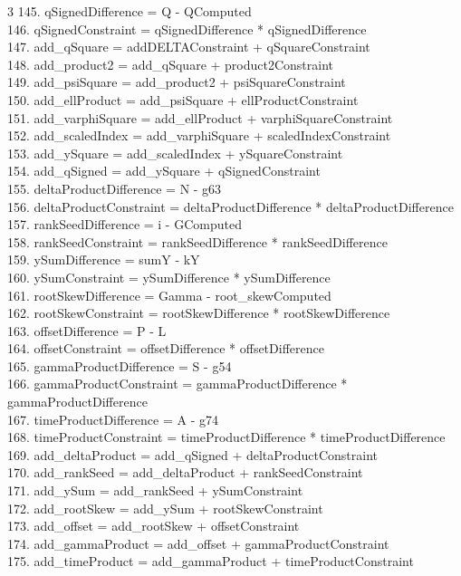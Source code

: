 \documentclass[10pt]{article}
\begin{document}
\begin{multicols}{3}
145. qSignedDifference = Q - QComputed\\
146. qSignedConstraint = qSignedDifference * qSignedDifference\\
147. add\_qSquare = addDELTAConstraint + qSquareConstraint\\
148. add\_product2 = add\_qSquare + product2Constraint\\
149. add\_psiSquare = add\_product2 + psiSquareConstraint\\
150. add\_ellProduct = add\_psiSquare + ellProductConstraint\\
151. add\_varphiSquare = add\_ellProduct + varphiSquareConstraint\\
152. add\_scaledIndex = add\_varphiSquare + scaledIndexConstraint\\
153. add\_ySquare = add\_scaledIndex + ySquareConstraint\\
154. add\_qSigned = add\_ySquare + qSignedConstraint\\
155. deltaProductDifference = N - g63\\
156. deltaProductConstraint = deltaProductDifference * deltaProductDifference\\
157. rankSeedDifference = i - GComputed\\
158. rankSeedConstraint = rankSeedDifference * rankSeedDifference\\
159. ySumDifference = sumY - kY\\
160. ySumConstraint = ySumDifference * ySumDifference\\
161. rootSkewDifference = Gamma - root\_skewComputed\\
162. rootSkewConstraint = rootSkewDifference * rootSkewDifference\\
163. offsetDifference = P - L\\
164. offsetConstraint = offsetDifference * offsetDifference\\
165. gammaProductDifference = S - g54\\
166. gammaProductConstraint = gammaProductDifference * gammaProductDifference\\
167. timeProductDifference = A - g74\\
168. timeProductConstraint = timeProductDifference * timeProductDifference\\
169. add\_deltaProduct = add\_qSigned + deltaProductConstraint\\
170. add\_rankSeed = add\_deltaProduct + rankSeedConstraint\\
171. add\_ySum = add\_rankSeed + ySumConstraint\\
172. add\_rootSkew = add\_ySum + rootSkewConstraint\\
173. add\_offset = add\_rootSkew + offsetConstraint\\
174. add\_gammaProduct = add\_offset + gammaProductConstraint\\
175. add\_timeProduct = add\_gammaProduct + timeProductConstraint\\
\end{multicols}
\end{document}
